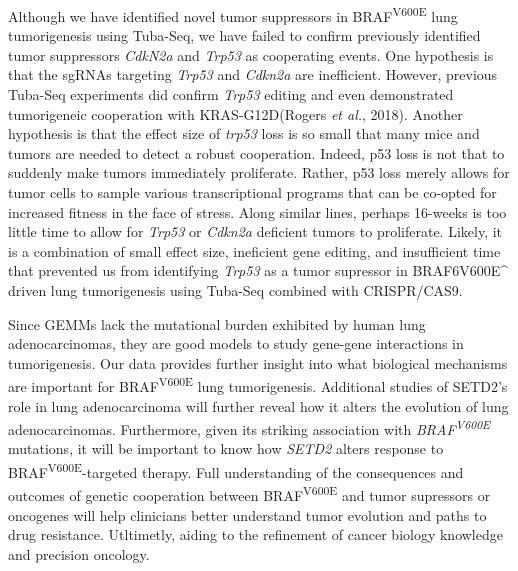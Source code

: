 Although we have identified novel tumor suppressors in BRAF\textsuperscript{V600E} lung tumorigenesis using Tuba-Seq, we have failed to confirm previously identified tumor suppressors \emph{CdkN2a} and \emph{Trp53} as cooperating events.
One hypothesis is that the sgRNAs targeting \emph{Trp53} and \emph{Cdkn2a} are inefficient. However, previous Tuba-Seq experiments did confirm \emph{Trp53} editing and even demonstrated tumorigeneic cooperation with KRAS-G12D(Rogers \emph{et al.}, 2018).
Another hypothesis is that the effect size of \emph{trp53} loss is so small that many mice and tumors are needed to detect a robust cooperation.
Indeed, p53 loss is not that to suddenly make tumors immediately proliferate.
Rather, p53 loss merely allows for tumor cells to sample various transcriptional programs that can be co-opted for increased fitness in the face of stress.
Along similar lines, perhaps 16-weeks is too little time to allow for \emph{Trp53} or \emph{Cdkn2a} deficient tumors to proliferate.
Likely, it is a combination of small effect size, ineficient gene editing, and insufficient time that prevented us from identifying \emph{Trp53} as a tumor supressor in BRAF6V600E\^{} driven lung tumorigenesis using Tuba-Seq combined with CRISPR/CAS9.

Since GEMMs lack the mutational burden exhibited by human lung adenocarcinomas, they are good models to study gene-gene interactions in tumorigenesis.
Our data provides further insight into what biological mechanisms are important for BRAF\textsuperscript{V600E} lung tumorigenesis.
Additional studies of SETD2's role in lung adenocarcinoma will further reveal how it alters the evolution of lung adenocarcinomas.
Furthermore, given its striking association with \emph{BRAF\textsuperscript{V600E}} mutations, it will be important to know how \emph{SETD2} alters response to BRAF\textsuperscript{V600E}-targeted therapy.
Full understanding of the consequences and outcomes of genetic cooperation between BRAF\textsuperscript{V600E} and tumor supressors or oncogenes will help clinicians better understand tumor evolution and paths to drug resistance.
Utltimetly, aiding to the refinement of cancer biology knowledge and precision oncology.

